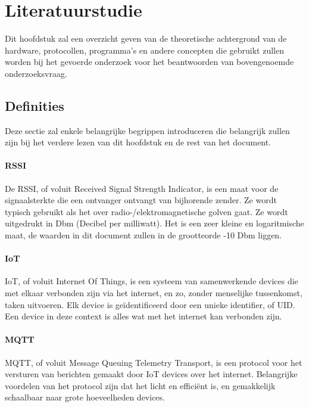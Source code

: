 
\chapter{Literatuurstudie}
\label{ch:literatuurstudie}

Dit hoofdstuk zal een overzicht geven van de theoretische achtergrond van de hardware, protocollen, programma's en andere concepten die gebruikt zullen worden bij het gevoerde onderzoek voor het beantwoorden van bovengenoemde onderzoeksvraag.

\section{Definities}
\label{sec:lit-definities}
Deze sectie zal enkele belangrijke begrippen introduceren die belangrijk zullen zijn bij het verdere lezen van dit hoofdstuk en de rest van het document.

\subsubsection{RSSI}
De RSSI, of voluit Received Signal Strength Indicator, is een maat voor de signaalsterkte die een ontvanger ontvangt van bijhorende zender. Ze wordt typisch gebruikt als het over radio-/elektromagnetische golven gaat.\autocite{Admin2022} Ze wordt uitgedrukt in Dbm (Decibel per milliwatt).\autocite{Tseard2016} Het is een zeer kleine en logaritmische maat, de waarden in dit document zullen in de grootteorde -10 Dbm liggen.

\subsubsection{IoT}
IoT, of voluit Internet Of Things, is een systeem van samenwerkende devices die met elkaar verbonden zijn via het internet, en zo, zonder menselijke tussenkomst, taken uitvoeren. Elk device is geïdentificeerd door een unieke identifier, of UID. Een device in deze context is alles wat met het internet kan verbonden zijn.\autocite{Gillis2022}

\subsubsection{MQTT}
MQTT, of voluit Message Queuing Telemetry Transport, is een protocol voor het versturen van berichten gemaakt door IoT devices over het internet. Belangrijke voordelen van het protocol zijn dat het licht en efficiënt is, en gemakkelijk schaalbaar naar grote hoeveelheden devices.\autocite{MQTT2022}


